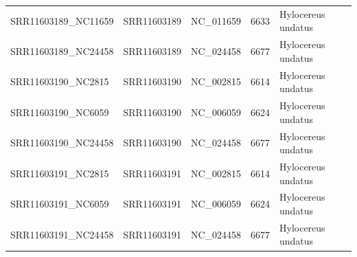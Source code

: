 \documentclass[11pt]{article}
\begin{document}
\begin{supptable}[ht]
{\begin{tabular}{lllll}
SRR11603189\_NC11659 & SRR11603189  & NC\_011659              & 6633            & Hylocereus undatus    \\
SRR11603189\_NC24458 & SRR11603189  & NC\_024458              & 6677            & Hylocereus undatus    \\
SRR11603190\_NC2815  & SRR11603190  & NC\_002815              & 6614            & Hylocereus undatus    \\
SRR11603190\_NC6059  & SRR11603190  & NC\_006059              & 6624            & Hylocereus undatus    \\
SRR11603190\_NC24458 & SRR11603190  & NC\_024458              & 6677            & Hylocereus undatus    \\
SRR11603191\_NC2815  & SRR11603191  & NC\_002815              & 6614            & Hylocereus undatus    \\
SRR11603191\_NC6059  & SRR11603191  & NC\_006059              & 6624            & Hylocereus undatus    \\
SRR11603191\_NC24458 & SRR11603191  & NC\_024458              & 6677            & Hylocereus undatus    \\ \hline
\end{tabular}%
}
\end{supptable}
\end{document}
